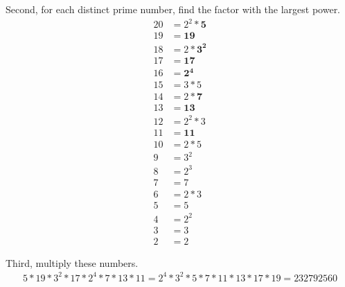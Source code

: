 \documentclass[a4paper, 12pt]{article}
\begin{document}
Second, for each distinct prime number, find the factor with the largest power.
\begin{align*} 
20 &= 2^2 * \mathbf{5} \\
19 &= \mathbf{19} \\
18 &= 2 * \mathbf{3^2} \\
17 &= \mathbf{17} \\
16 &= \mathbf{2^4} \\
15 &= 3 * 5 \\
14 &= 2 * \mathbf{7} \\
13 &= \mathbf{13} \\
12 &= 2^2 * 3 \\
11 &= \mathbf{11} \\
10 &= 2 * 5 \\
9 &= 3^2 \\
8 &= 2^3 \\
7 &= 7 \\
6 &= 2 * 3 \\
5 &= 5 \\
4 &= 2^2 \\
3 &= 3 \\
2 &= 2 
\end{align*}

Third, multiply these numbers.
\begin{align*}
5 * 19 * 3^2 * 17 * 2^4 * 7 * 13 * 11 = 2^4 * 3^2 * 5 * 7 * 11 * 13 * 17 * 19 = 232792560
\end{align*}
\end{document}
